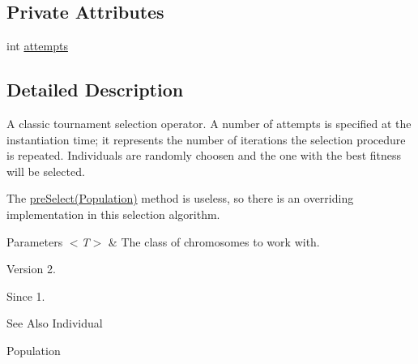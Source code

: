 \subsection*{Private Attributes}
\begin{DoxyCompactItemize}
\item 
int \hyperlink{classjenes_1_1stage_1_1operator_1_1common_1_1_tournament_selector_3_01_t_01extends_01_chromosome_01_4_a4f608252ca95d848b77e3dd8c2a15f93}{attempts}
\end{DoxyCompactItemize}


\subsection{Detailed Description}
A classic tournament selection operator. A number of attempts is specified at the instantiation time; it represents the number of iterations the selection procedure is repeated. Individuals are randomly choosen and the one with the best fitness will be selected. 

The \hyperlink{}{pre\-Select(\-Population)} method is useless, so there is an overriding implementation in this selection algorithm. 


\begin{DoxyParams}{Parameters}
{\em $<$\-T$>$} & The class of chromosomes to work with.\\
\hline
\end{DoxyParams}
\begin{DoxyVersion}{Version}
2. 
\end{DoxyVersion}
\begin{DoxySince}{Since}
1.
\end{DoxySince}
\begin{DoxySeeAlso}{See Also}
Individual 

Population 
\end{DoxySeeAlso}


